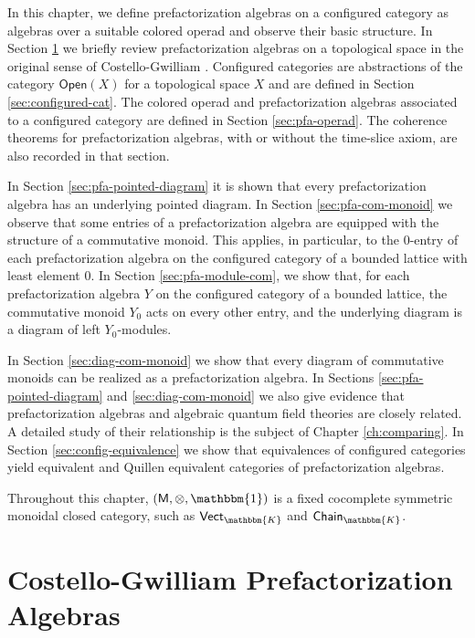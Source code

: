 \documentclass[11pt]{amsbook}
\numberwithin{section}{chapter}
\numberwithin{subsection}{section}
\numberwithin{equation}{section}
\theoremstyle{plain}
\theoremstyle{definition}
\newcommand{\fieldk}{\mathbbm{K}}
\newcommand{\M}{\mathsf{M}}
\newcommand{\tensorunit}{\mathbbm{1}}
\newcommand{\Chaink}{\mathsf{Chain}_{\fieldk}}
\newcommand{\Open}{\mathsf{Open}}
\newcommand{\Openx}{\Open(X)}
\newcommand{\Vectk}{\mathsf{Vect}_{\fieldk}}
\begin{document}
In this chapter, we define prefactorization algebras on a configured category as algebras over a suitable colored operad and observe their basic structure.  In Section \ref{sec:costello} we briefly review prefactorization algebras on a topological space in the original sense of Costello-Gwilliam \cite{cg}.  Configured categories are abstractions of the category $\Openx$ for a topological space $X$ and are defined in Section \ref{sec:configured-cat}.  The colored operad and prefactorization algebras associated to a configured category are defined in Section \ref{sec:pfa-operad}.  The coherence theorems for prefactorization algebras, with or without the time-slice axiom, are also recorded in that section.

In Section \ref{sec:pfa-pointed-diagram} it is shown that every prefactorization algebra has an underlying pointed diagram.  In Section \ref{sec:pfa-com-monoid} we observe that some entries of a prefactorization algebra are equipped with the structure of a commutative monoid.  This applies, in particular, to the $0$-entry of each prefactorization algebra on the configured category of a bounded lattice with least element $0$.  In Section \ref{sec:pfa-module-com}, we show that, for each prefactorization algebra $Y$ on the configured category of a bounded lattice, the commutative monoid $Y_0$ acts on every other entry, and the underlying diagram is a diagram of left $Y_0$-modules.

In Section \ref{sec:diag-com-monoid} we show that every diagram of commutative monoids can be realized as a prefactorization algebra.  In Sections \ref{sec:pfa-pointed-diagram} and \ref{sec:diag-com-monoid} we also give evidence that prefactorization algebras and algebraic quantum field theories are closely related.  A detailed study of their relationship is the subject of Chapter \ref{ch:comparing}.  In Section \ref{sec:config-equivalence} we show that equivalences of configured categories yield equivalent and Quillen equivalent categories of prefactorization algebras.

Throughout this chapter, $(\M,\otimes,\tensorunit)$ is a fixed cocomplete symmetric monoidal closed category, such as $\Vectk$ and $\Chaink$.


\section{Costello-Gwilliam Prefactorization Algebras}\label{sec:costello}
\end{document}
